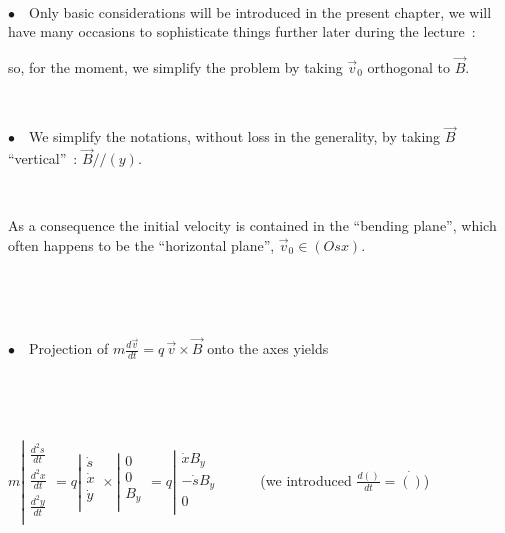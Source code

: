 \documentclass[12pt]{paper}
\newcommand{\B}{\ensuremath{\vec B}}
\newcommand{\nib}{\noindent $\bullet$~}
\newcommand{\vv}{\ensuremath{\vec v}}
\begin{document}
~

\begin{center}

\fbox{$ m \frac{\textstyle{d \vv}}{\textstyle{dt}} = q \, \vec v \times \B $ }
\end{center}

\clearpage

\nib\ Only basic considerations will be introduced in the present chapter, 
we will have many occasions to sophisticate things further 
later during the lecture~: 

so, for the moment, we simplify the problem  by taking $\vv_0 $ orthogonal to $\B$. 

~


\begin{minipage}[b]{.65\linewidth}
\Large

\nib\ We  simplify the notations, without loss in the generality,  
by taking $\B$ ``vertical''~:   $\B // (y)$. 

 
~

As a consequence the initial velocity is contained in the ``bending plane'', 
which  often happens to be the  ``horizontal plane'', $\vv_0 \in (Osx)$. 

~

~

\nib\ Projection of $ m \frac{\textstyle{d \vv}}{\textstyle{dt}} = q \, \vec v \times \B $ onto the axes yields

~

~

$ m \left| 
\begin{array}{l} 
\frac{ \textstyle{d^2s}}{\textstyle{dt}} \\
\frac{ \textstyle{d^2x}}{\textstyle{dt}}  \\
\frac{ \textstyle{d^2y}}{\textstyle{dt}} \\
\end{array} 
\right. 
= 
q \left| 
\begin{array}{l} 
\dot s    \\
\dot x \\
\dot y \\
\end{array} 
\right. 
\times
\left| 
\begin{array}{l} 
0    \\
0 \\
B_y \\
\end{array}
\right. 
= 
q \left| 
\begin{array}{lr} 
\dot x B_y    \\
-\dot s B_y  \\
0           \\
\end{array} 
\right. 
$    ~ ~ ~ (we introduced $\frac{\textstyle{d()}}{\textstyle{dt}} = \dot {()}$)

\end{minipage}
\end{document}

